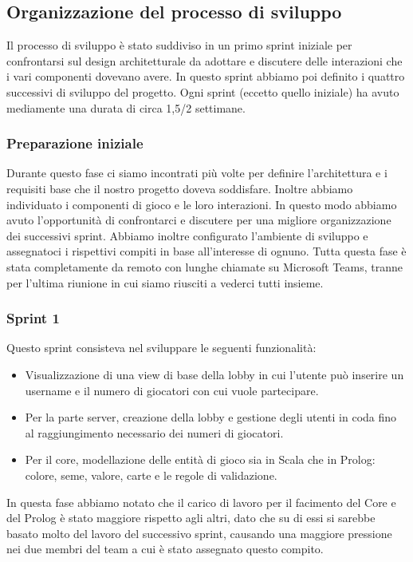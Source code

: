 \subsection{Organizzazione del processo di sviluppo}
Il processo di sviluppo è stato suddiviso in un primo sprint iniziale per confrontarsi sul design architetturale da adottare e discutere delle interazioni che i vari componenti dovevano avere.
In questo sprint abbiamo poi definito i quattro successivi di sviluppo del progetto.
Ogni sprint (eccetto quello iniziale) ha avuto mediamente una durata di circa 1,5/2 settimane.

\subsubsection{Preparazione iniziale}
Durante questo fase ci siamo incontrati più volte per definire l’architettura e i requisiti base che il nostro progetto doveva soddisfare.
Inoltre abbiamo individuato i componenti di gioco e le loro interazioni.
In questo modo abbiamo avuto l'opportunità di confrontarci e discutere per una migliore organizzazione dei successivi sprint.
Abbiamo inoltre configurato l’ambiente di sviluppo e assegnatoci i rispettivi compiti in base all’interesse di ognuno.
Tutta questa fase è stata completamente da remoto con lunghe chiamate su Microsoft Teams, tranne per l’ultima riunione in cui siamo riusciti a vederci tutti insieme.

\subsubsection{Sprint 1}
Questo sprint consisteva nel sviluppare le seguenti funzionalità:
\begin{itemize}
    \item Visualizzazione di una view di base della lobby in cui l’utente può inserire un username e il numero di giocatori con cui vuole partecipare.
    \item Per la parte server, creazione della lobby e gestione degli utenti in coda fino al raggiungimento necessario dei numeri di giocatori.
    \item Per il core, modellazione delle entità di gioco sia in Scala che in Prolog: colore, seme, valore, carte e le regole di validazione.
\end{itemize}
In questa fase abbiamo notato che il carico di lavoro per il facimento del Core e del Prolog è stato maggiore rispetto agli altri, dato che su di essi si sarebbe basato molto del lavoro del successivo sprint, causando una maggiore pressione nei due membri del team a cui è stato assegnato questo compito.


